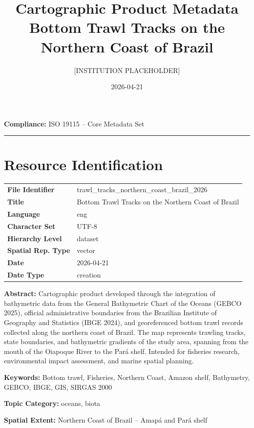 \documentclass[12pt, a4paper]{article}
\title{\textbf{Cartographic Product Metadata}\\
\large Bottom Trawl Tracks on the Northern Coast of Brazil}
\author{[INSTITUTION PLACEHOLDER]}
\date{2026-04-21}
\begin{document}
\maketitle
\noindent\textbf{Compliance:} ISO 19115 -- Core Metadata Set
\hrule
\vspace{1em}

\section{Resource Identification}

\begin{tabular}{>{\bfseries}p{5cm} p{9cm}}
File Identifier     & trawl\_tracks\_northern\_coast\_brazil\_2026 \\
Title               & Bottom Trawl Tracks on the Northern Coast of Brazil \\
Language            & eng \\
Character Set       & UTF-8 \\
Hierarchy Level     & dataset \\
Spatial Rep. Type   & vector \\
Date                & 2026-04-21 \\
Date Type           & creation \\
\end{tabular}

\vspace{1em}
\noindent\textbf{Abstract:}
Cartographic product developed through the integration of bathymetric data from the General Bathymetric Chart of the Oceans (GEBCO 2025), official administrative boundaries from the Brazilian Institute of Geography and Statistics (IBGE 2024), and georeferenced bottom trawl records collected along the northern coast of Brazil. The map represents trawling tracks, state boundaries, and bathymetric gradients of the study area, spanning from the mouth of the Oiapoque River to the Pará shelf. Intended for fisheries research, environmental impact assessment, and marine spatial planning.

\vspace{0.5em}
\noindent\textbf{Keywords:} Bottom trawl, Fisheries, Northern Coast, Amazon shelf, Bathymetry, GEBCO, IBGE, GIS, SIRGAS 2000

\noindent\textbf{Topic Category:} oceans, biota

\vspace{0.5em}
\noindent\textbf{Spatial Extent:} Northern Coast of Brazil -- Amapá and Pará shelf
\end{document}
